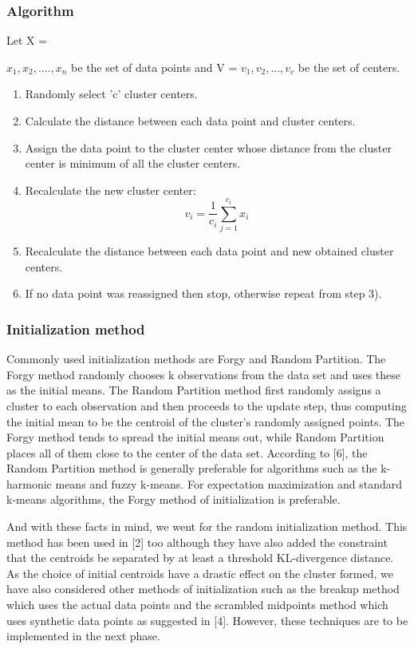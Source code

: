 \subsubsection{Algorithm}
Let X = { $x_1, x_2,.... ,x_n$ be the set of data points and V = { $v_1,v_2 , ...,v_c$ } be the set of centers. 
        \begin{enumerate}[1.)]
                \item Randomly select 'c' cluster centers. 
                \item Calculate the distance between each data point and cluster centers. 
                \item Assign the data point to the cluster center whose distance from the cluster center is minimum of all the cluster centers. 
                \item Recalculate the new cluster center: 
                        \begin{equation}
                                v_i=\frac{1}{c_i}\sum_{j=1}^{c_i}{x_i}
                        \end{equation}
                \item  Recalculate the distance between each data point and new obtained cluster centers. 
                \item If no data point was reassigned then stop, otherwise repeat from step 3).
        \end{enumerate}

        \subsubsection{Initialization method}
        Commonly used initialization methods are Forgy and Random Partition. The Forgy method randomly chooses k observations from the data set and uses
        these as the initial means. The Random Partition method first randomly assigns a cluster to each observation and then proceeds to the update step, thus
        computing the initial mean to be the centroid of the cluster’s randomly assigned points. The Forgy method tends to spread the initial means out, while
        Random Partition places all of them close to the center of the data set. According to [6], the Random Partition method is generally preferable for
        algorithms such as the k-harmonic means and fuzzy k-means. For expectation maximization and standard k-means algorithms, the Forgy method of initialization is preferable. 
        \par And with these facts in mind, we went for the random initialization method. This method has been used in [2] too although they have also added
        the constraint that the centroids be separated by at least a threshold KL-divergence distance. As the choice of initial centroids have a drastic
        effect on the cluster formed, we have also considered other methods of initialization such as the breakup method which uses the actual data points
        and the scrambled midpoints method which uses synthetic data points as suggested in [4]. However, these techniques are to be implemented in the next phase.

}
